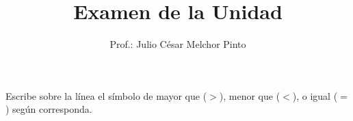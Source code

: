 \documentclass[12pt,addpoints]{evalua}
\title{Examen de la Unidad}
\author{Prof.: Julio César Melchor Pinto}
\begin{document}
\begin{questions}
      \question[10] Escribe sobre la línea el símbolo de mayor que ($>$), menor que ($<$), o igual ($=$) según corresponda.

      \begin{multicols}{2}
            \begin{parts}

\end{parts}
\end{multicols}
\end{questions}
\end{document}
